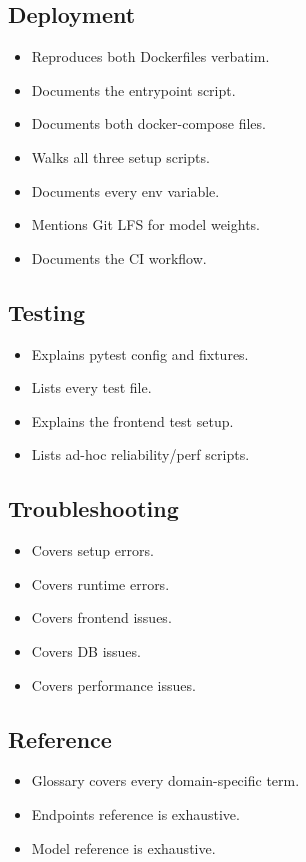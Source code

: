 \documentclass[11pt,a4paper,oneside]{book}
\begin{document}
\subsection{Deployment}
\begin{itemize}
  \item[$\square$] Reproduces both Dockerfiles verbatim.
  \item[$\square$] Documents the entrypoint script.
  \item[$\square$] Documents both docker-compose files.
  \item[$\square$] Walks all three setup scripts.
  \item[$\square$] Documents every env variable.
  \item[$\square$] Mentions Git LFS for model weights.
  \item[$\square$] Documents the CI workflow.
\end{itemize}

\subsection{Testing}
\begin{itemize}
  \item[$\square$] Explains pytest config and fixtures.
  \item[$\square$] Lists every test file.
  \item[$\square$] Explains the frontend test setup.
  \item[$\square$] Lists ad-hoc reliability/perf scripts.
\end{itemize}

\subsection{Troubleshooting}
\begin{itemize}
  \item[$\square$] Covers setup errors.
  \item[$\square$] Covers runtime errors.
  \item[$\square$] Covers frontend issues.
  \item[$\square$] Covers DB issues.
  \item[$\square$] Covers performance issues.
\end{itemize}

\subsection{Reference}
\begin{itemize}
  \item[$\square$] Glossary covers every domain-specific term.
  \item[$\square$] Endpoints reference is exhaustive.
  \item[$\square$] Model reference is exhaustive.
\end{itemize}
\end{document}
